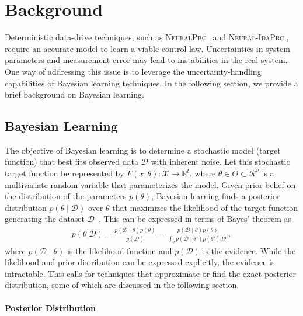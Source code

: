 \chapter{Background}
\label{ch:background}

Deterministic data-drive techniques, such as \textsc{NeuralPbc}~\cite{neuralpbc}
and \textsc{Neural-IdaPbc} \cite{neuralidapbc}, require an accurate model to
learn a viable control law. Uncertainties in system parameters and measurement
error may lead to instabilities in the real system. One way of addressing this
issue is to leverage the uncertainty-handling capabilities of Bayesian learning
techniques. In the following section, we provide a brief background on Bayesian
learning.
%

\section{Bayesian Learning}


The objective of Bayesian learning is to determine a stochastic model (target
function) that best fits observed data $\mathcal{D}$ with inherent noise. Let
this stochastic target function be represented by $F(x; \theta) : \mathcal{X}
\rightarrow \mathbb{R}^t$, where $\theta \in \Theta \subset \mathcal{R}^v$ is a
multivariate random variable that parameterizes the model. Given prior belief on
the distribution of the parameters $p(\theta)$, Bayesian learning finds a
posterior distribution $p(\theta \mid \mathcal{D})$ over $\theta$ that maximizes
the likelihood of the target function generating the dataset
$\mathcal{D}$~\cite{bishop2006pattern}. This can be expressed in terms of Bayes'
theorem as 
\begin{align}
  p(\theta | \mathcal{D}) = \frac{p(\mathcal{D} \mid \theta) p(\theta)}{p(\mathcal{D})}
  = \frac{p(\mathcal{D} \mid \theta) p(\theta)}{\int_\theta p(\mathcal{D} \mid \theta') p(\theta') d\theta'},
\end{align}
where $p(\mathcal{D} \mid \theta)$ is the likelihood function and
$p(\mathcal{D})$ is the evidence. While the likelihood and prior distribution
can be expressed explicitly, the evidence is intractable. This calls for
techniques that approximate or find the exact posterior distribution, some of
which are discussed in the following section.

\subsubsection{Posterior Distribution}

